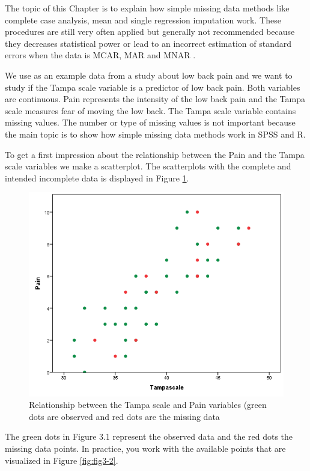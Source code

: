 \documentclass[]{book}
\begin{document}
The topic of this Chapter is to explain how simple missing data methods
like complete case analysis, mean and single regression imputation work.
These procedures are still very often applied \citep{Eekhout2012} but
generally not recommended because they decreases statistical power or
lead to an incorrect estimation of standard errors when the data is
MCAR, MAR and MNAR
\citep{Eekhout2014, VanBuuren2018, enders2010applied}.

We use as an example data from a study about low back pain and we want
to study if the Tampa scale variable is a predictor of low back pain.
Both variables are continuous. Pain represents the intensity of the low
back pain and the Tampa scale measures fear of moving the low back. The
Tampa scale variable contains missing values. The number or type of
missing values is not important because the main topic is to show how
simple missing data methods work in SPSS and R.

To get a first impression about the relationship between the Pain and
the Tampa scale variables we make a scatterplot. The scatterplots with
the complete and intended incomplete data is displayed in Figure
\ref{fig:fig3-1}.

\begin{figure}

{\centering \includegraphics[width=0.7\linewidth]{images/fig3.2a} 

}

\caption{Relationship between the Tampa scale and Pain variables (green dots are observed and red dots are the missing data}\label{fig:fig3-1}
\end{figure}

The green dots in Figure 3.1 represent the observed data and the red
dots the missing data points. In practice, you work with the available
points that are visualized in Figure \ref{fig:fig3-2}.
\end{document}
